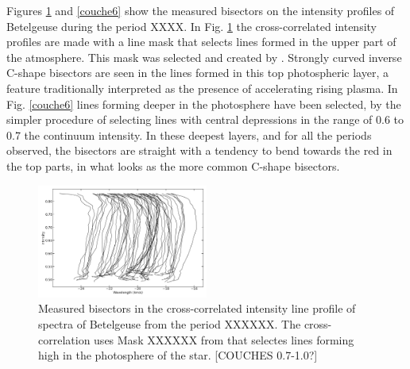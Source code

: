 \documentclass{/Users/art2/TeX/aanda/aa}
\def\kms {km\,s$^{-1}$}
\begin{document}
Figures \ref{couche0} and \ref{couche6} show the measured 
bisectors on the intensity profiles of Betelgeuse during the period XXXX. In Fig. \ref{couche0} the cross-correlated intensity profiles are 
made with a line mask  that selects lines formed in the upper part of the atmosphere. This mask was selected and created by 
 \cite{kravchenko_tomography_2018}. Strongly curved 
inverse C-shape bisectors are seen in the lines formed in this top photospheric layer, a feature traditionally interpreted as the 
presence of accelerating rising plasma.   In Fig. \ref{couche6} lines forming deeper in the photosphere have been selected, by the simpler 
procedure of selecting lines with central depressions in the range of 0.6 to 0.7 the continuum intensity. In these deepest layers, and 
for all the periods observed, the bisectors are straight with a tendency to bend towards the red in the top parts, in what looks as 
the more common C-shape bisectors.
\begin{figure}
   \includegraphics[width=0.5\textwidth]{bissecteurmaskKateryna.png}
   \caption{Measured bisectors in the cross-correlated intensity line profile of spectra of Betelgeuse from the period XXXXXX. The cross-correlation
   uses Mask XXXXXX from \cite{kravchenko_tomography_2018} that selectes lines forming high in the photosphere of the star. [COUCHES 0.7-1.0?]}
   \label{couche0}
   \end{figure}
\end{document}
